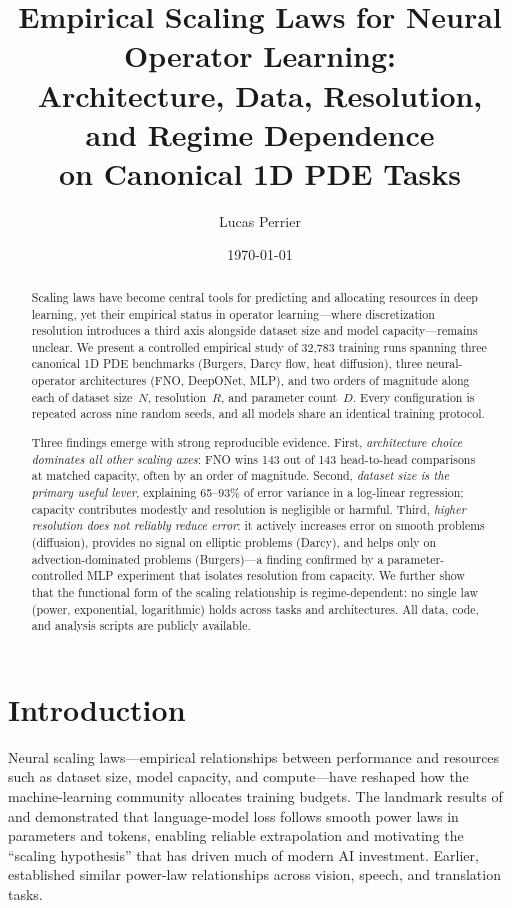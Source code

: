 \documentclass[11pt]{article}
\title{%
  Empirical Scaling Laws for Neural Operator Learning:\\
  Architecture, Data, Resolution, and Regime Dependence\\
  on Canonical 1D PDE Tasks%
}
\author{Lucas Perrier}
\date{\today}
\newcommand{\totalRuns}{32{,}783}
\begin{document}
\maketitle

\begin{abstract}
Scaling laws have become central tools for predicting and allocating
resources in deep learning, yet their empirical status in operator
learning---where discretization resolution introduces a third axis
alongside dataset size and model capacity---remains unclear.
We present a controlled empirical study of \totalRuns{} training runs
spanning three canonical 1D PDE benchmarks (Burgers, Darcy flow,
heat diffusion), three neural-operator architectures (FNO, DeepONet,
MLP), and two orders of magnitude along each of dataset size~$N$,
resolution~$R$, and parameter count~$D$.
Every configuration is repeated across nine random seeds, and all
models share an identical training protocol.

Three findings emerge with strong reproducible evidence.
First, \emph{architecture choice dominates all other scaling axes}:
FNO wins 143 out of 143 head-to-head comparisons at matched capacity,
often by an order of magnitude.
Second, \emph{dataset size is the primary useful lever}, explaining
65--93\% of error variance in a log-linear regression;
capacity contributes modestly and resolution is negligible or harmful.
Third, \emph{higher resolution does not reliably reduce error}:
it actively increases error on smooth problems (diffusion), provides
no signal on elliptic problems (Darcy), and helps only on
advection-dominated problems (Burgers)---a finding confirmed by
a parameter-controlled MLP experiment that isolates resolution from
capacity.
We further show that the functional form of the scaling relationship
is regime-dependent: no single law (power, exponential, logarithmic)
holds across tasks and architectures.
All data, code, and analysis scripts are publicly available.
\end{abstract}


\section{Introduction}
\label{sec:intro}

Neural scaling laws---empirical relationships between performance and
resources such as dataset size, model capacity, and compute---have
reshaped how the machine-learning community allocates training budgets.
The landmark results of \citet{kaplan2020scaling} and
\citet{hoffmann2022training} demonstrated that language-model loss
follows smooth power laws in parameters and tokens, enabling reliable
extrapolation and motivating the ``scaling hypothesis'' that has driven
much of modern AI investment.
Earlier, \citet{hestness2017deep} established similar power-law
relationships across vision, speech, and translation tasks.
\end{document}
